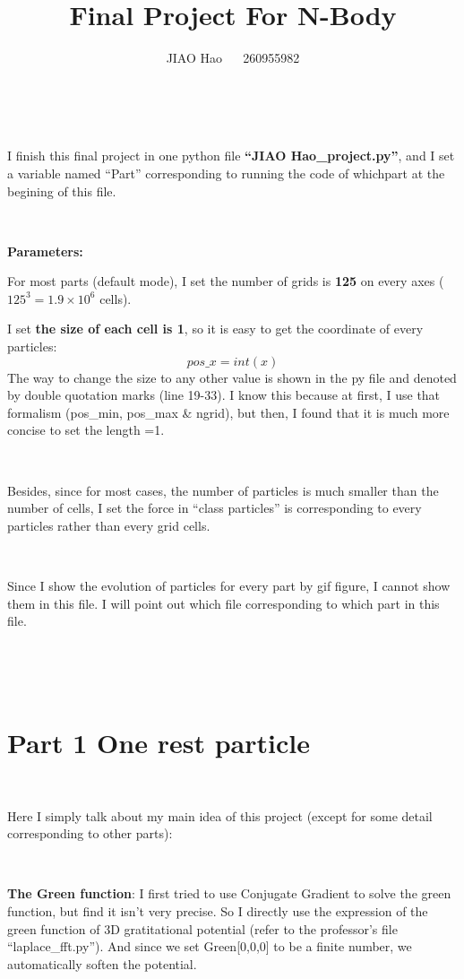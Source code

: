 \documentclass[showpacs, oneside, onecolumn, prl, amsmath, amssymb, nofootinbib, superscriptaddress, notitlepage]{revtex4-1}
\newcommand\be{\begin{equation}}
\newcommand\ee{\end{equation}}
\begin{document}
	
\title{Final Project For N-Body}

\author{JIAO Hao ~~ 260955982}

\maketitle

~~~~

I finish this final project in one python file \textbf{``JIAO Hao\_project.py''}, and I set a variable named ``Part'' corresponding to running the code of whichpart at the begining of this file.

~~~~

\textbf{Parameters:}

For most parts (default mode), I set the number of grids is \textbf{125} on every axes ($125^3=1.9\times10^6$ cells).

I set \textbf{the size of each cell is 1}, so it is easy to get the coordinate of every particles:
\be
pos\_x=int(x)
\ee
The way to change the size to any other value is shown in the py file and denoted by double quotation marks (line 19-33). I know this because at first, I use that formalism (pos\_min, pos\_max \& ngrid), but then, I found that it is much more concise to set the length =1.

~~~

Besides, since for most cases, the number of particles is much smaller than the number of cells, I set the force in ``class particles'' is corresponding to every particles rather than every grid cells.

~~~~

Since I show the evolution of particles for every part by gif figure, I cannot show them in this file. I will point out which file corresponding to which part in this file.

~~~~

~~~~

\section{Part 1 One rest particle}

~~~~

Here I simply talk about my main idea of this project (except for some detail corresponding to other parts):

~~~~

\textbf{The Green function}: I first tried to use Conjugate Gradient to solve the green function, but find it isn't very precise. So I directly use the expression of the green function of 3D gratitational potential (refer to the professor's file ``laplace\_fft.py''). And since we set Green[0,0,0] to be a finite number, we automatically soften the potential.
\end{document}
